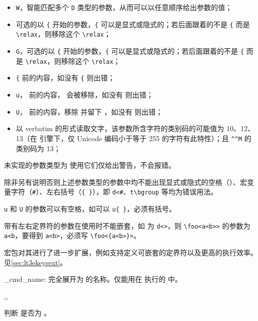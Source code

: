 \documentclass{cusdoc}
\begin{document}
{\begin{itemize}
  \item[\CCE W] \texttt W，智能匹配多个 \texttt D 类型的参数，从而可以以任意顺序给出参数的值；
  \item[\CCE g] 可选的以 \verb|{| 开始的参数，\verb|{| 可以是显式或隐式的；若后面跟着的不是 \verb|{| 而是 \verb|\relax|，则移除这个 \verb|\relax|；
  \item[\CCE G] \texttt G，可选的以 \verb|{| 开始的参数，\verb|{| 可以是显式或隐式的；若后面跟着的不是 \verb|{| 而是 \verb|\relax|，则移除这个 \verb|\relax|；
  \item[\CCS l] \verb|{| 前的内容，如没有 \verb|{| 则出错；
  \item[\CCS u] \texttt u， 前的内容， 会被移除，如没有  则出错；
  \item[\CCE U] \texttt U， 前的内容，移除  并留下 ，如没有  则出错；
  \item[\CCS v] 以 verbatim 的形式读取文字，该参数所含字符的类别码的可能值为 10、12、13（在 \pupTeX 引擎下，仅 Unicode 编码小于等于 255 的字符有此特性）；且 \texttt{\^{}\^{}M} 的类别码为 13；
\end{itemize}
}

未实现的参数类型为  使用它们仅给出警告，不会报错。

除非另有说明否则上述参数类型的参数中均不能出现显式或隐式的空格（\texttt\textvisiblespace）、宏变量字符（\texttt\#）、左右括号（\texttt{\{ \}}），即 \verb|d<#|、\verb|t\bgroup| 等均为错误用法。

\texttt u 和 \texttt U 的参数可以有空格，如可以 \verb|u{ }|，必须有括号。

带有左右定界符的参数在使用时不能嵌套，如  为 \verb|d<>|，则 \verb|\foo<a<b>>|
的参数为 \verb|a<b|，要得到 \verb|a<b>|，必须写 \verb|\foo<{a<b>}>|。

 宏包对其进行了进一步扩展，例如支持定义可嵌套的定界符以及更高的执行效率。见\cref{sec:lt3ekeysext}。

\begin{function}[EXP]{\ekeys_cmd_name:}
完全展开为  的名称。仅能用在  执行的  中。
\end{function}

\begin{function}[EXP]{\IfQuarkNoValueTF,\IfQuarkNoValueT,\IfQuarkNoValueF}
  \begin{syntax}
    \V\IfQuarkNoValueTF {}  
  \end{syntax}
判断  是否为 。
\end{function}
\end{document}
